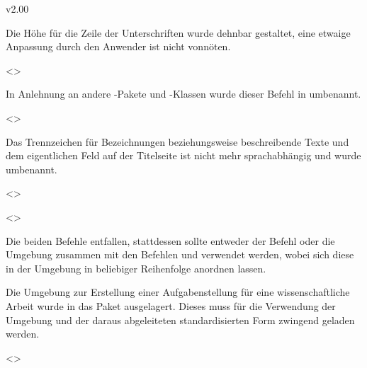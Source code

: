 \begin{Cessations}{v2.00}
\begin{Cessation}
Die Höhe für die Zeile der Unterschriften wurde dehnbar gestaltet, eine etwaige 
Anpassung durch den Anwender ist nicht vonnöten.
\end{Cessation}

\begin{Cessation}
  {}
  <>
\printdeclarationlist

In Anlehnung an andere -Pakete und -Klassen wurde 
dieser Befehl in  umbenannt.
\end{Cessation}

\begin{Cessation}
  {}
  <>
\printdeclarationlist

Das Trennzeichen für Bezeichnungen beziehungsweise beschreibende Texte und dem 
eigentlichen Feld auf der Titelseite ist nicht mehr sprachabhängig und wurde 
umbenannt.
\end{Cessation}

\begin{Cessation}
  {}
  <>
\begin{Cessation}
  {}
  <>
\printdeclarationlist

Die beiden Befehle entfallen, stattdessen sollte entweder der Befehl 
 oder die Umgebung  zusammen mit 
den Befehlen  und  verwendet werden, 
wobei sich diese in der Umgebung in beliebiger Reihenfolge anordnen lassen.
\end{Cessation}
\end{Cessation}


\minisec{\taskname}

\begin{Entity}{}
Die Umgebung zur Erstellung einer Aufgabenstellung für eine wissenschaftliche 
Arbeit wurde in das Paket  ausgelagert. Dieses muss 
für die Verwendung der Umgebung  und der daraus abgeleiteten 
standardisierten Form zwingend geladen werden.

\begin{Cessation}
  {}
  <>
\begin{Cessation}
  {}
\begin{Cessation}
  {}
\printdeclarationlist


\end{Cessation}
\end{Cessation}
\end{Cessation}
\end{Entity}
\end{Cessations}
